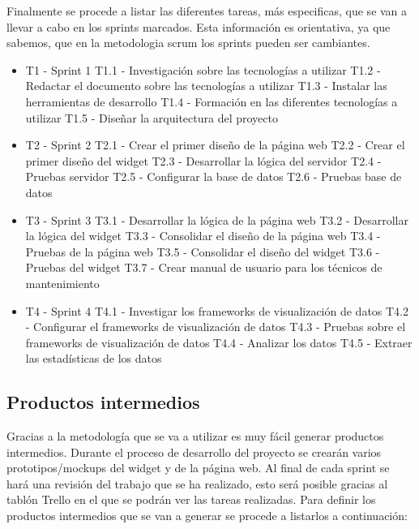 Finalmente se procede a listar las diferentes tareas, más especificas, que se van a llevar a cabo en los sprints marcados. Esta información es orientativa, ya que sabemos, que en la metodologia scrum los sprints pueden ser cambiantes.

\begin{itemize}
	\item T1 - Sprint 1
	\subitem T1.1 - Investigación sobre las tecnologías a utilizar
	\subitem T1.2 - Redactar el documento sobre las tecnologías a utilizar
	\subitem T1.3 - Instalar las herramientas de desarrollo
	\subitem T1.4 - Formación en las diferentes tecnologías a utilizar
	\subitem T1.5 - Diseñar la arquitectura del proyecto
	\item T2 - Sprint 2
	\subitem T2.1 - Crear el primer diseño de la página web
	\subitem T2.2 - Crear el primer diseño del widget
	\subitem T2.3 -	Desarrollar la lógica del servidor
	\subitem T2.4 - Pruebas servidor
	\subitem T2.5 - Configurar la base de datos
	\subitem T2.6 - Pruebas base de datos
	\item T3 - Sprint 3
	\subitem T3.1 - Desarrollar la lógica de la página web
	\subitem T3.2 - Desarrollar la lógica del widget
	\subitem T3.3 - Consolidar el diseño de la página web
	\subitem T3.4 - Pruebas de la página web
	\subitem T3.5 - Consolidar el diseño del widget
	\subitem T3.6 - Pruebas del widget
	\subitem T3.7 - Crear manual de usuario para los técnicos de mantenimiento
	\item T4 - Sprint 4
	\subitem T4.1 - Investigar los frameworks de visualización de datos
	\subitem T4.2 - Configurar el frameworks de visualización de datos
	\subitem T4.3 - Pruebas sobre el frameworks de visualización de datos
	\subitem T4.4 - Analizar los datos
	\subitem T4.5 - Extraer las estadísticas de los datos
	
\end{itemize}


\subsection{Productos intermedios}
Gracias a la metodología que se va a utilizar es muy fácil generar productos intermedios. Durante el proceso de desarrollo del proyecto se crearán varios prototipos/mockups del widget y de la página web. Al final de cada sprint se hará una revisión del trabajo que se ha realizado, esto será posible gracias al tablón Trello en el que se podrán ver las tareas realizadas. Para definir los productos intermedios que se van a generar se procede a listarlos a continuación:


